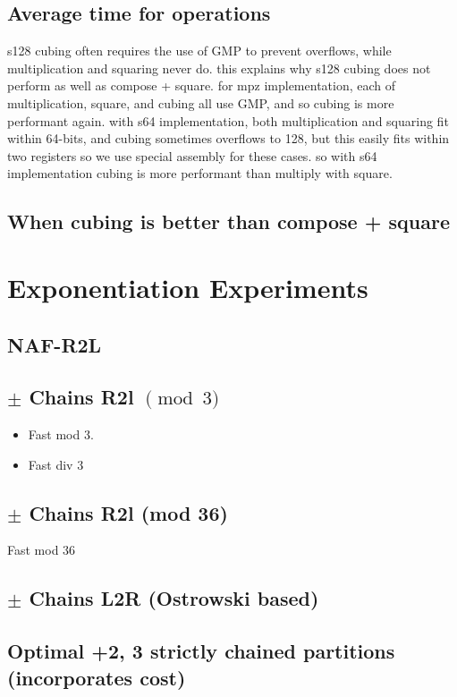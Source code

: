 \documentclass{ucalgthes1}
\theoremstyle{definition}
\begin{document}
\subsection{Average time for operations}

s128 cubing often requires the use of GMP to prevent overflows, while multiplication and squaring never do.  this explains why s128 cubing does not perform as well as compose + square.   for mpz implementation, each of multiplication, square, and cubing all use GMP, and so cubing is more performant again.  with s64 implementation, both multiplication and squaring fit within 64-bits, and cubing sometimes overflows to 128, but this easily fits within two registers so we use special assembly for these cases. so with s64 implementation cubing is more performant than multiply with square.

\subsection{When cubing is better than compose + square}


\section{Exponentiation Experiments}
\label{sec:exponentiation}

\subsection{NAF-R2L}

\subsection{$\pm$ Chains R2l $\pmod 3$}
\begin{itemize}
\item Fast mod 3.
\item Fast div 3
\end{itemize}

\subsection{$\pm$ Chains R2l (mod 36)}
Fast mod 36

\subsection{$\pm$ Chains L2R (Ostrowski based)}

\subsection{Optimal +2, 3 strictly chained partitions (incorporates cost)}
\end{document}
